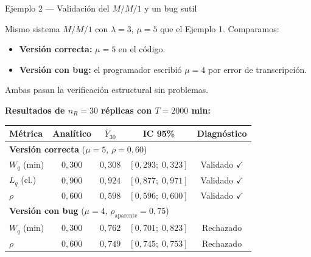 \documentclass[aspectratio=1610, 10pt]{beamer}
\begin{document}
\begin{frame}{Ejemplo 2 — Validación del $M/M/1$ y un bug sutil}
  \begin{ejemplobox}
    \footnotesize
    Mismo sistema $M/M/1$ con $\lambda=3$, $\mu=5$ que el Ejemplo 1.
    Comparamos:
    \begin{itemize}\itemsep1pt
      \item \textbf{Versión correcta:} $\mu=5$ en el código.
      \item \textbf{Versión con bug:} el programador escribió $\mu=4$ por
        error de transcripción.
    \end{itemize}
    Ambas pasan la verificación estructural sin problemas.
  \end{ejemplobox}

  \vspace{4pt}
  \footnotesize\textbf{Resultados de $n_R=30$ réplicas con $T=2000$ min:}
  \begin{center}\scriptsize
    \renewcommand{\arraystretch}{1.25}
    \begin{tabular}{lcccc}
      \toprule
      \textbf{Métrica} & \textbf{Analítico} & $\bar Y_{30}$ & \textbf{IC 95\%}
        & \textbf{Diagnóstico} \\
      \midrule
      \multicolumn{5}{l}{\textcolor{deepgreen}{\textbf{Versión correcta}
        ($\mu=5$, $\rho=0{,}60$)}} \\
      $W_q$ (min) & $0{,}300$ & $0{,}308$ & $[0{,}293;\;0{,}323]$
        & \textcolor{deepgreen}{Validado $\checkmark$} \\
      $L_q$ (cl.) & $0{,}900$ & $0{,}924$ & $[0{,}877;\;0{,}971]$
        & \textcolor{deepgreen}{Validado $\checkmark$} \\
      $\rho$      & $0{,}600$ & $0{,}598$ & $[0{,}596;\;0{,}600]$
        & \textcolor{deepgreen}{Validado $\checkmark$} \\
      \midrule
      \multicolumn{5}{l}{\textcolor{red!70!black}{\textbf{Versión con bug}
        ($\mu=4$, $\rho_{\text{aparente}}=0{,}75$)}} \\
      $W_q$ (min) & $0{,}300$ & $0{,}762$ & $[0{,}701;\;0{,}823]$
        & \textcolor{red!70!black}{Rechazado} \\
      $\rho$      & $0{,}600$ & $0{,}749$ & $[0{,}745;\;0{,}753]$
        & \textcolor{red!70!black}{Rechazado} \\
      \bottomrule
    \end{tabular}
  \end{center}
\end{frame}
\end{document}
